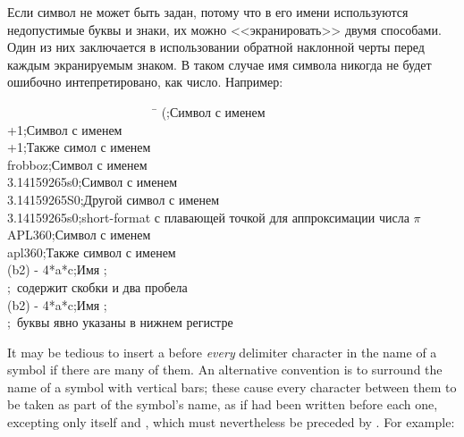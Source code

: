 Если символ не может быть задан, потому что в его имени используются
недопустимые буквы и знаки, их можно <<экранировать>> двумя способами. Один из
них заключается в использовании обратной наклонной черты перед каждым
экранируемым знаком. В таком случае имя символа никогда не будет ошибочно
интепретировано, как число.
Например:
\begin{lisp}
~~~~~~~~~~~~~~~~~~~~~~~~\=\kill
{\Xbackslash}(\>;{\rm Символ с именем \cd{(}} \\
{\Xbackslash}+1\>;{\rm Символ с именем } \\
+{\Xbackslash}1\>;{\rm Также симол с именем } \\
{\Xbackslash}frobboz\>;{\rm Символ с именем } \\
3.14159265{\Xbackslash}s0\>;{\rm Символ с именем } \\
3.14159265{\Xbackslash}S0\>;{\rm Другой символ с именем } \\
3.14159265s0\>;{\rm short-format с плавающей точкой для аппроксимации числа \(\pi\)} \\
APL{\Xbackslash}{\Xbackslash}360\>;{\rm Символ с именем } \\
apl{\Xbackslash}{\Xbackslash}360\>;{\rm Также символ с именем } \\
{\Xbackslash}(b{\Xcircumflex}2{\Xbackslash}){\Xbackslash} -{\Xbackslash} 4*a*c\>;{\rm Имя ;} \\
\>;~{\rm содержит скобки и два пробела} \\
{\Xbackslash}({\Xbackslash}b{\Xcircumflex}2{\Xbackslash}){\Xbackslash} -{\Xbackslash} 4*{\Xbackslash}a*{\Xbackslash}c\>;{\rm Имя ;} \\
\>;~{\rm буквы явно указаны в нижнем регистре}
\end{lisp}
It may be tedious to insert a \cd{{\Xbackslash}} before {\it every} delimiter
character in the name of a symbol if there are many of them.
An alternative convention is to surround the name of a symbol
with vertical bars; these cause every character between them to
be taken as part of the symbol's name, as if \cd{{\Xbackslash}} had been written
before each one, excepting only
\cd{|} itself and \cd{{\Xbackslash}}, which must nevertheless be preceded by \cd{{\Xbackslash}}.
For example:

